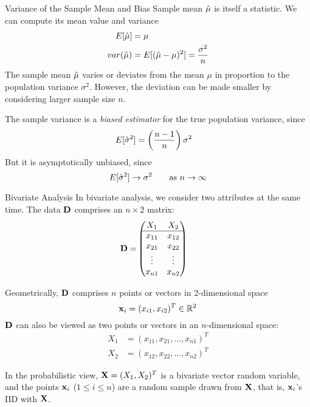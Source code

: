\begin{frame}{Variance of the Sample Mean and Bias}
Sample mean $\hat{\mu}$ is itself a statistic. We can 
compute its mean value and
variance
\begin{align*}
  E[\hat{\mu}] & = \mu\\
  var(\hat{\mu}) & = E[(\hat{\mu} -\mu)^2] =  {\sigma^2 \over n}
\end{align*}
The sample mean $\hat{\mu}$ varies or deviates from the
 mean $\mu$ in proportion to the population
variance $\sigma^2$. However, the deviation can be made smaller by
considering larger sample size $n$.

\bigskip
The sample variance
is a {\em biased estimator}
for the true population variance, since
\begin{align*}
    E[\hat{\sigma}^2]    & = \left({n-1\over n} \right) \sigma^2
\end{align*}
But it is asymptotically unbiased, since
$$E[\hat{\sigma}^2] \to \sigma^2 \qquad \text{as } n \to \infty$$

\end{frame}


\begin{frame}{Bivariate Analysis}
In bivariate analysis, we consider two attributes at the same
time. 
The data $\mathbf{D}$ comprises an $n \times 2$ matrix:
\begin{align*}
    \bD = &
    \matr{%
        X_1 & X_2\\
        \hline
        x_{11} & x_{12}\\
        x_{21} & x_{22}\\
        \vdots & \vdots\\
        x_{n1} & x_{n2}%
        }
\end{align*}

Geometrically, $\mathbf{D}$ comprises
$n$ points or vectors in 2-dimensional space
$$\mathbf{x}_i = (x_{i1}, x_{i2})^T \in {\mathord{\mathbb R}}^2$$ 
$\mathbf{D}$ can also be viewed as two points or vectors in an
$n$-dimensional space:
\begin{align*}
X_1 & = (x_{11}, x_{21}, \ldots, x_{n1})^T\\
X_2 & = (x_{12}, x_{22}, \ldots, x_{n2})^T
\end{align*}

\bigskip
In the probabilistic view,
$\mathbf{X} = (X_1,X_2)^T$ is a bivariate
vector random variable, and the points $\mathbf{x}_i$ ($1
\le i \le n$) are a random sample drawn from $\mathbf{X}$,
that is, $\mathbf{x}_i$'s IID with $\mathbf{X}$.
\end{frame}


